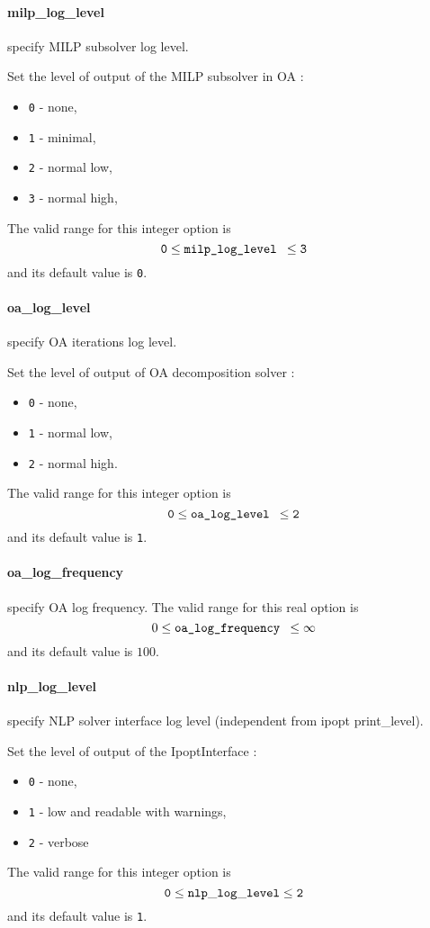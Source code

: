 \paragraph{milp\_log\_level} specify MILP subsolver log level.

 Set the level of output of the MILP subsolver in
OA :
 \begin{itemize}
  \item {\tt 0} - none,
  \item {\tt 1} - minimal,
  \item {\tt 2} - normal low,
  \item {\tt 3} - normal high,
  \end{itemize}
The valid range for this integer option is
$${\tt 0} \le \hbox{\tt milp\_log\_level } \le {\tt 3}$$
and its default value is {\tt 0}.


\paragraph{oa\_log\_level} specify OA iterations log level.

 Set the level of output of OA decomposition solver :
 \begin{itemize}
  \item {\tt 0} - none,
  \item {\tt 1} - normal low,
  \item {\tt 2} - normal high.
  \end{itemize}
  The valid range for this integer option is
  $${\tt 0} \le \hbox{\tt oa\_log\_level } \le {\tt 2}$$
  and its default value is {\tt 1}.

\paragraph{oa\_log\_frequency} specify OA log frequency.
  The valid range for this real option is
  $$ 0 \le \hbox{\tt oa\_log\_frequency } \le \infty $$
  and its default value is $100$.



  \paragraph{nlp\_log\_level} specify NLP solver interface log level (independent from ipopt print\_level).

  Set the level of output of the IpoptInterface :
  \begin{itemize}
  \item {\tt 0} - none,
  \item {\tt 1} - low and readable with warnings,
  \item {\tt 2} - verbose
  \end{itemize}
 The valid range for this integer option is
$${\tt 0} \le {\tt nlp\_log\_level } \le {\tt 2}$$
and its default value is {\tt 1}.

